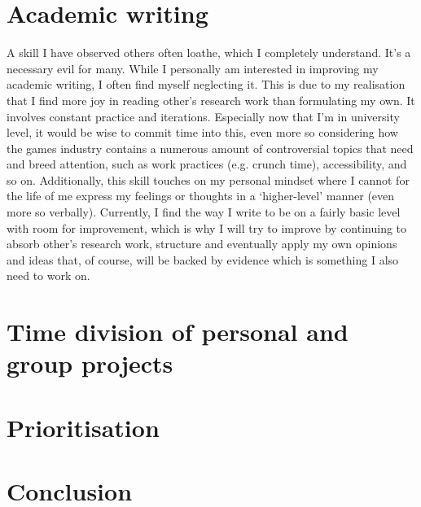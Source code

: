\documentclass{scrartcl}
\begin{document}
\section{Academic writing}
A skill I have observed others often loathe, which I completely understand. It's a necessary evil for many. While I personally am interested in improving my academic writing, I often find myself neglecting it. This is due to my realisation that I find more joy in reading other's research work than formulating my own. It involves constant practice and iterations. Especially now that I'm in university level, it would be wise to commit time into this, even more so considering how the games industry contains a numerous amount of controversial topics that need and breed attention, such as work practices (e.g. crunch time), accessibility, and so on. Additionally, this skill touches on my personal mindset where I cannot for the life of me express my feelings or thoughts in a `higher-level' manner (even more so verbally). Currently, I find the way I write to be on a fairly basic level with room for improvement, which is why I will try to improve by continuing to absorb other's research work, structure and eventually apply my own opinions and ideas that, of course, will be backed by evidence which is something I also need to work on. 

\section{Time division of personal and group projects}


\section{Prioritisation}


\section{Conclusion}
\end{document}
